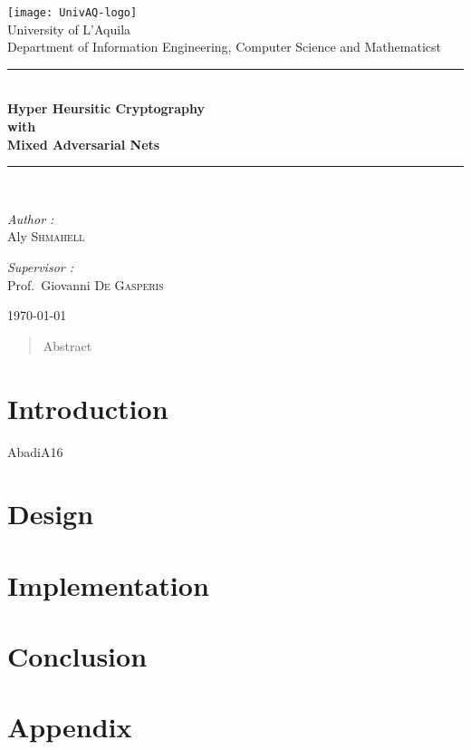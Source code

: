 \documentclass[12pt]{article}
\begin{document}
\begin{titlepage}
	\begin{center}
		\texttt{[image: UnivAQ-logo]}\\[1cm]
		{\large University of L'Aquila}\\[0.5cm]
		{\large Department of Information Engineering, Computer Science and Mathematicst}\\[0.5cm]
		\rule{\linewidth}{0.5mm} \\[0.4cm]
		{\huge \bfseries Hyper Heursitic Cryptography\\
			with\\
			Mixed Adversarial Nets \\[0.4cm] }
		\rule{\linewidth}{0.5mm} \\[1.5cm]
		\noindent
		\begin{minipage}{0.4\textwidth}
			\begin{flushleft}
				\large
				\emph{Author :}\\
				Aly \textsc{Shmahell}
			\end{flushleft}
		\end{minipage}%
		\begin{minipage}{0.4\textwidth}
			\begin{flushleft}
				\large
				\emph{Supervisor :} \\
				Prof.~Giovanni \textsc{De Gasperis}\\
			\end{flushleft}
		\end{minipage}
		\vfill
		\today
	\end{center}
\end{titlepage}
\begin{abstract}
Abstract
\end{abstract}
\newpage
\section{\textbf{Introduction}}\label{sec:introduction}
AbadiA16 ~\citep{DBLP:journals/corr/AbadiA16}
\newpage
\section{\textbf{Design}}\label{sec:design}
\newpage
\section{\textbf{Implementation}}\label{sec:implementation}
\newpage
\section{\textbf{Conclusion}}\label{sec:conclusion}
\newpage

\medskip


\newpage

\appendix
\section*{\textbf{Appendix}}
\end{document}

